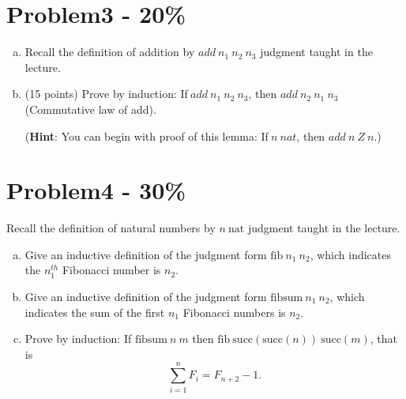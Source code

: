 \documentclass{article}
\begin{document}
\section*{Problem3 - 20\%}

\begin{enumerate}[(a)]
    \item Recall the definition of addition by $add\ n_{1}\ n_{2}\ n_{3}$ judgment taught in the lecture.
    \item (15 points) Prove by induction: If$\ add\ n_{1}\ n_{2}\ n_{3}$, then $add\ n_{2}\ n_{1}\ n_{3}$ (Commutative law of add).
    
    (\textbf{Hint}: You can begin with proof of this lemma: If$\ n\ nat$, then $add\ n\ Z\ n$.)
\end{enumerate}

\section*{Problem4 - 30\%}

Recall the definition of natural numbers by $n\ \mbox{nat}$ judgment taught in the lecture.
\begin{enumerate}[(a)]
    \item Give an inductive definition of the judgment form
    $\mbox{fib}\ n_1\ n_2$, which indicates the $n_1^{th}$ Fibonacci number is $n_2$.
    \item Give an inductive definition of the judgment form
    $\mbox{fibsum}\ n_1\ n_2$, which indicates the sum of the first $n_1$ Fibonacci
    numbers is $n_2$.
    \item Prove by induction:
    If $\mbox{fibsum}\ n\ m$ then $\mbox{fib}\
    \mbox{succ}(\mbox{succ}(n))\ \mbox{succ}(m)$, that is
    $$\sum_{i=1}^n F_i = F_{n+2} - 1.$$
\end{enumerate}
\end{document}

